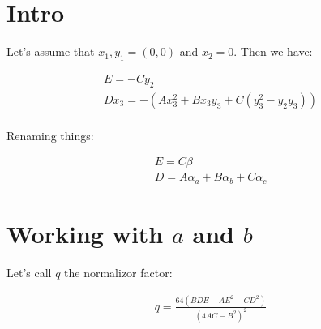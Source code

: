 \documentclass{article}
\begin{document}
	\section{Intro}
	Let's assume that $x_1, y_1 = (0,0)$ and $x_2 = 0$. Then we have:
	
	\begin{align*}
	E=-Cy_2\\
	Dx_3=-(Ax_3^2 + Bx_3y_3 + C(y_3^2-y_2y_3))\\
	\end{align*}
	
	Renaming things:
	
	\begin{align}
	E=C\beta\\
	D = A\alpha_a + B\alpha_b + C\alpha_c
	\end{align}
	
	\section{Working with $a$ and $b$}
	
	Let's call $q$ the normalizor factor:
	
	\begin{align*}
	q = \frac{64(BDE - AE^2 - CD^2)}{(4AC-B^2)^2}
	\end{align*}
	
\end{document}
